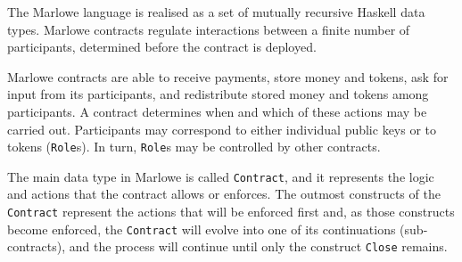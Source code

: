 \documentclass[english,runningheads]{llncs}
\begin{document}
The Marlowe language is realised as a set of mutually recursive Haskell
data types. Marlowe contracts regulate interactions between a finite number
of participants, determined before the contract is deployed.

Marlowe contracts are able to receive payments, store money and tokens,
ask for input from its participants, and redistribute stored money
and tokens among participants. A contract determines when and which of
these actions may be carried out. Participants may correspond to either
individual public keys or to tokens (\texttt{Role}s). In turn, \texttt{Role}s
may be controlled by other contracts.

The main data type in Marlowe is called \texttt{Contract}, and it represents
the logic and actions that the contract allows or enforces. The outmost
constructs of the \texttt{Contract} represent the actions that will be enforced
first and, as those constructs become enforced, the \texttt{Contract} will
evolve into one of its continuations (sub-contracts), and the process
will continue until only the construct \texttt{Close} remains.
\end{document}
